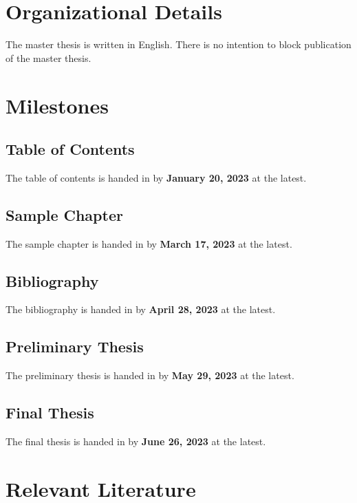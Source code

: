 \documentclass[english,notitlepage,smartquotes]{hgbreport}
\begin{document}

\section{Organizational Details}

The master thesis is written in English.
There is no intention to block publication of the master thesis.

\section{Milestones}

\subsection{Table of Contents}

The table of contents is handed in by \textbf{January 20, 2023} at the latest.

\subsection{Sample Chapter}

The sample chapter is handed in by \textbf{March 17, 2023} at the latest.

\subsection{Bibliography}

The bibliography is handed in by \textbf{April 28, 2023} at the latest.

\subsection{Preliminary Thesis}

The preliminary thesis is handed in by \textbf{May 29, 2023} at the latest.

\subsection{Final Thesis}

The final thesis is handed in by \textbf{June 26, 2023} at the latest.

\section{Relevant Literature}
\end{document}
